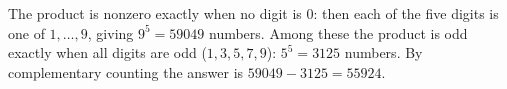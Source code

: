 The product is nonzero exactly when no digit is $0$: then each of the five digits is one of $1,\dots,9$, giving $9^5=59049$ numbers. Among these the product is odd exactly when all digits are odd ($1,3,5,7,9$): $5^5=3125$ numbers. By complementary counting the answer is $59049-3125=\boxed{55924}$.

